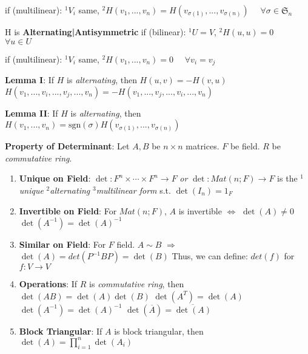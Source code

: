 \documentclass[9pt]{article}
\begin{document}
\hspace{78pt} if (multilinear): $^1V_i$ same, \quad $^2H(v_1,...,v_n)=H(v_{\sigma(1)},...,v_{\sigma(n)})$ \ \ $\forall \sigma\in\mathfrak{S}_n$

\quad H is \textbf{Alternating|Antisymmetric} if (bilinear): $^1U=V$, \quad $^2H(u,u)=0$ \ \ $\forall u\in U$

\hspace{153pt} if (multilinear): $^1V_i$ same, \quad $^2H(v_1,...,v_n)=0$ \ \ $\forall v_i=v_j$ 

\quad \textbf{Lemma I}: If $H$ is \textit{alternating}, then \quad $H(u,v)=-H(v,u)$ \qquad $H(v_1,...,v_i,...,v_j,...,v_n)=-H(v_1,...,v_j,...,v_i,...,v_n)$ 

\quad \textbf{Lemma II}: If $H$ is \textit{alternating}, then \quad $H(v_1,...,v_n)=\text{sgn}(\sigma)H(v_{\sigma(1)},...,v_{\sigma(n)})$ 

\textbf{Property of Determinant}: Let $A,B$ be $n\times n$ matrices. \quad $F$ be field. \quad $R$ be \textit{commutative ring}.
\begin{enumerate}[itemsep=-2pt, topsep=-2pt]
    \item \textbf{Unique on Field}: $\det:F^n\times \cdots\times F^n\to F$ \textit{or} $\det: Mat(n;F) \to F$ is the $^1$\textit{unique} $^2$\textit{alternating} $^3$\textit{multilinear form} s.t. $\det(I_n)=1_F$
    \item \textbf{Invertible on Field}: For $Mat(n;F)$, $A$ is invertible $\Leftrightarrow$ $\det(A)\ne0$ \quad $\det(A^{-1})=\det(A)^{-1}$ 
    \item \textbf{Similar on Field}: For $F$ field. \quad $A\sim B$ $\Rightarrow$ $\det(A)=det(P^{-1}BP)=\det(B)$ \qquad Thus, we can define: $det(f)$ for $f:V\to V$
    \item \textbf{Operations}: {\scriptsize If $R$ is \textit{commutative ring}}, then $\det(AB)=\det(A)\det(B)$ \quad $\det(A^T)=\det(A)$  \quad $\det(A^{-1})=\det(A)^{-1}$ \quad $\det(\overline{A})=\overline{\det(A)}$
    \item \textbf{Block Triangular}: If $A$ is block triangular, then $\det(A)=\prod_{i=1}^n\det(A_i)$ 
\end{enumerate}
\end{document}
